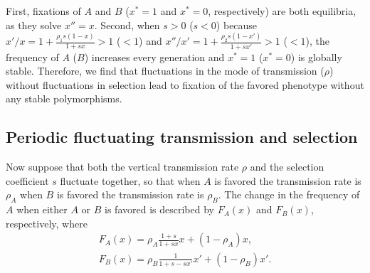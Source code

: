 \documentclass[12pt]{extarticle} %
\begin{document}
First, fixations of $A$ and $B$ ($x^*=1$ and $x^*=0$, respectively) are both equilibria, as they solve $x''=x$.
Second, when $s>0$ ($s<0$) because $x'/x = 1+\frac{\rho_1 s (1-x)}{1+sx} > 1$ ($<1$) and $x''/x' = 1+\frac{\rho_2 s (1-x')}{1+sx'} > 1$ ($<1$), the frequency of $A$ ($B$) increases every generation and $x^*=1$ ($x^*=0$) is globally stable.
Therefore, we find that fluctuations in the mode of transmission ($\rho$) without fluctuations in selection lead to fixation of the favored phenotype without any stable polymorphisms.

\subsection*{Periodic fluctuating transmission and selection}

Now suppose that both the vertical transmission rate $\rho$ and the selection coefficient $s$ fluctuate together, so that when $A$ is favored the transmission rate is $\rho_A$ when $B$ is favored the transmission rate is $\rho_B$.
The change in the frequency of $A$ when either $A$ or $B$ is favored is described by $F_A(x)$ and $F_B(x)$, respectively, where
\begin{equation}\begin{aligned} \label{eq:recurrence_periodic_fluc}
F_A(x) = \rho_A \frac{1+s}{1+sx} x + (1-\rho_A)x, \\
F_B(x) = \rho_B \frac{1}{1+s-sx'} x' + (1-\rho_B)x'.
\end{aligned}\end{equation}
\end{document}
